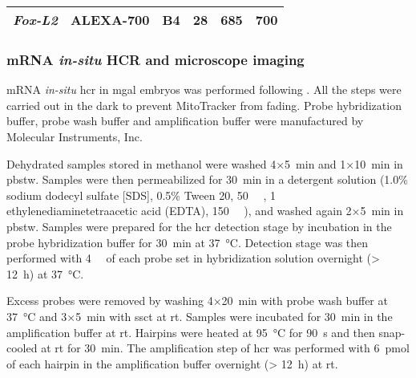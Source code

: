 {\begin{longtable}[c]{llcccc}
    \textit{Fox-L2}                                              & ALEXA-700                                                        & B4                                                               & 28                                                                                     & 685                                                                                    & 700                                                                                 \\* \bottomrule \bottomrule
\end{longtable}
}

\subsubsection{mRNA \textit{in-situ} HCR and microscope imaging}
mRNA \textit{in-situ} \gls{hcr} in \gls{mgal} embryos was performed following . All the steps were carried out in the dark to prevent MitoTracker from fading. Probe hybridization buffer, probe wash buffer and amplification buffer were manufactured by Molecular Instruments, Inc.

Dehydrated samples stored in methanol were washed 4×\qty{5}{\minute} and 1×\qty{10}{\minute} in \gls{pbstw}. Samples were then permeabilized for \qty{30}{\minute} in a detergent solution (1.0\% sodium dodecyl sulfate [SDS], 0.5\% Tween 20, \qty{50}{\milli\molar} , \qty{1}{\milli\molar} ethylenediaminetetraacetic acid (EDTA), \qty{150}{\milli\molar} ), and washed again 2×\qty{5}{\minute} in \gls{pbstw}. Samples were prepared for the \gls{hcr} detection stage by incubation in the probe hybridization buffer for \qty{30}{\minute} at \qty{37}{\degreeCelsius}. Detection stage was then performed with \qty{4}{\nano\molar} of each probe set in hybridization solution overnight (\qty{> 12}{\hour}) at \qty{37}{\degreeCelsius}.

Excess probes were removed by washing 4×\qty{20}{\minute} with probe wash buffer at \qty{37}{\degreeCelsius} and 3×\qty{5}{\minute} with \gls{ssct} at \gls{rt}. Samples were incubated for \qty{30}{\minute} in the amplification buffer at \gls{rt}. Hairpins were heated at \qty{95}{\degreeCelsius} for \qty{90}{\second} and then snap-cooled at \gls{rt} for \qty{30}{\minute}. The amplification step of \gls{hcr} was performed with \qty{6}{\pmol} of each hairpin in the amplification buffer overnight (\qty{> 12}{\hour}) at \gls{rt}.


